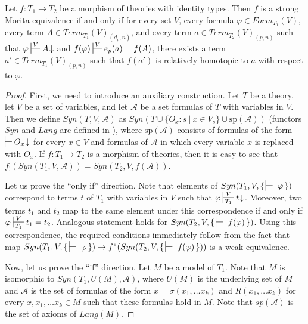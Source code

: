 \documentclass[reqno]{amsart}
\theoremstyle{definition}
\theoremstyle{remark}
\numberwithin{figure}{section}
\begin{document}
\begin{prop}
Let $f : T_1 \to T_2$ be a morphism of theories with identity types.
Then $f$ is a strong Morita equivalence if and only if for every set $V$, every formula $\varphi \in Form_{T_1}(V)$,
every term $A \in Term_{T_1}(V)_{(d_p,n)}$, and every term $a \in Term_{T_2}(V)_{(p,n)}$ such that $\varphi \sststile{}{V} A\!\downarrow$ and $f(\varphi) \sststile{}{V} e_p(a) = f(A)$,
there exists a term $a' \in Term_{T_1}(V)_{(p,n)}$ such that $f(a')$ is relatively homotopic to $a$ with respect to $\varphi$.
\end{prop}
\begin{proof}
First, we need to introduce an auxiliary construction.
Let $T$ be a theory, let $V$ be a set of variables, and let $\mathcal{A}$ be a set formulas of $T$ with variables in $V$.
Then we define $Syn(T,V,\mathcal{A})$ as $Syn(T \cup \{ O_x : s\ |\ x \in V_s \} \cup \mathrm{sp}(\mathcal{A}))$ (functors $Syn$ and $Lang$ are defined in \cite{alg-models}),
where $\mathrm{sp}(\mathcal{A})$ consists of formulas of the form $\sststile{}{} O_x\!\downarrow$ for every $x \in V$
and formulas of $\mathcal{A}$ in which every variable $x$ is replaced with $O_x$.
If $f : T_1 \to T_2$ is a morphism of theories, then it is easy to see that $f_!(Syn(T_1,V,\mathcal{A})) = Syn(T_2,V,f(\mathcal{A}))$.

Let us prove the ``only if'' direction.
Note that elements of $Syn(T_1, V, \{\,\sststile{}{}~\varphi\,\})$ correspond to terms $t$ of $T_1$ with variables in $V$ such that $\varphi \sststile{T_1}{V} t\!\downarrow$.
Moreover, two terms $t_1$ and $t_2$ map to the same element under this correspondence if and only if $\varphi \sststile{T_1}{V} t_1 = t_2$.
Analogous statement holds for $Syn(T_2, V, \{\,\sststile{}{}~f(\varphi)\,\})$.
Using this correspondence, the required conditions immediately follow from the fact that
map $Syn(T_1, V, \{\,\sststile{}{}~\varphi\,\}) \to f^*(Syn(T_2, V, \{\,\sststile{}{}~f(\varphi)\,\}))$ is a weak equivalence.

Now, let us prove the ``if'' direction.
Let $M$ be a model of $T_1$.
Note that $M$ is isomorphic to $Syn(T_1, U(M), \mathcal{A})$, where $U(M)$ is the underlying set of $M$ and $\mathcal{A}$ is the set of formulas of the form
$x = \sigma(x_1, \ldots x_k)$ and $R(x_1, \ldots x_k)$ for every $x, x_1, \ldots x_k \in M$ such that these formulas hold in $M$.
Note that $sp(\mathcal{A})$ is the set of axioms of $Lang(M)$.


\end{proof}
\end{document}
